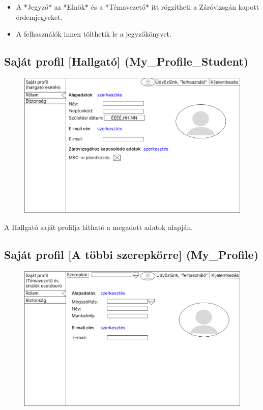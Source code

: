 \documentclass[a4paper,12pt]{article}
\begin{document}
\begin{itemize}
	\item A *Jegyző* az *Elnök* és a *Témavezető* itt rögzítheti a Záróvizsgán kapott érdemjegyeket.
	\item A felhasználók innen tölthetik le a jegyzőkönyvet.
\end{itemize}

\subsection{Saját profil [Hallgató] (My\_Profile\_Student)}

\begin{figure}
	\centering
	\includegraphics[width=\textwidth]{images/Web_pages/My_Profile_Student.jpg}
	\caption{}
	\label{fig:My_Profile_Student}
\end{figure}

A Hallgató saját profilja látható a megadott adatok alapján.

\subsection{Saját profil [A többi szerepkörre] (My\_Profile)}

\begin{figure}
	\centering
	\includegraphics[width=\textwidth]{images/Web_pages/My_Profile.jpg}
	\caption{}
	\label{fig:My_Profile}
\end{figure}
\end{document}

